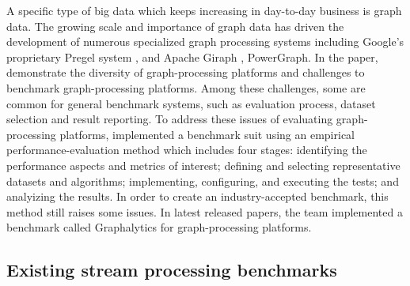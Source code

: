 A specific type of big data which keeps increasing in day-to-day business is graph data. The growing scale and importance of graph data has driven the development of numerous specialized graph processing systems including Google's proprietary Pregel system \cite{Pregel}, and Apache Giraph \cite{Giraph}, PowerGraph\cite{PowerGraph}. In the paper, \citet{guo2014benchmarking} demonstrate the diversity of graph-processing platforms and challenges to benchmark graph-processing platforms. Among these challenges, some are common for general benchmark systems, such as evaluation process, dataset selection and result reporting. To address these issues of evaluating graph-processing platforms, \citeauthor{guo2014well} implemented a benchmark suit using an empirical performance-evaluation method which includes four stages: identifying the performance aspects and metrics of interest; defining and selecting representative datasets and algorithms; implementing, configuring, and executing the tests; and analyizing the results. In order to create an industry-accepted benchmark, this method still raises some issues. In latest released papers\cite{iosup2014towards, capota2015graphalytics}, the team implemented a benchmark called Graphalytics for graph-processing platforms. 

\subsection{ Existing stream processing benchmarks}


